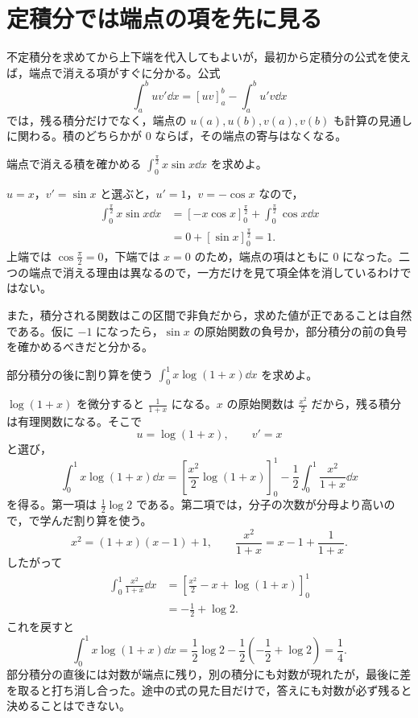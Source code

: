 \section{定積分では端点の項を先に見る}\label{節:定積分の部分積分}

不定積分を求めてから上下端を代入してもよいが，最初から定積分の公式を使えば，端点で消える項がすぐに分かる。公式
\[
 \int_a^b uv'\dd x=[uv]_a^b-\int_a^b u'v\dd x
\]
では，残る積分だけでなく，端点の $u(a),u(b),v(a),v(b)$ も計算の見通しに関わる。積のどちらかが $0$ ならば，その端点の寄与はなくなる。

\begin{example}{端点で消える積を確かめる}
$\int_0^{\frac\pi2}x\sin x\dd x$ を求めよ。
\end{example}

$u=x$，$v'=\sin x$ と選ぶと，$u'=1$，$v=-\cos x$ なので，
\[
\begin{aligned}
 \int_0^{\frac\pi2}x\sin x\dd x
 &=[-x\cos x]_0^{\frac\pi2}
   +\int_0^{\frac\pi2}\cos x\dd x\\
 &=0+[\sin x]_0^{\frac\pi2}=1.
\end{aligned}
\]
上端では $\cos\frac\pi2=0$，下端では $x=0$ のため，端点の項はともに $0$ になった。二つの端点で消える理由は異なるので，一方だけを見て項全体を消しているわけではない。

また，積分される関数はこの区間で非負だから，求めた値が正であることは自然である。仮に $-1$ になったら，$\sin x$ の原始関数の負号か，部分積分の前の負号を確かめるべきだと分かる。

\begin{example}{部分積分の後に割り算を使う}
$\int_0^1x\log(1+x)\dd x$ を求めよ。
\end{example}

$\log(1+x)$ を微分すると $\frac1{1+x}$ になる。$x$ の原始関数は $\frac{x^2}{2}$ だから，残る積分は有理関数になる。そこで
\[
 u=\log(1+x),\qquad v'=x
\]
と選び，
\[
 \int_0^1x\log(1+x)\dd x
 =\left[\frac{x^2}{2}\log(1+x)\right]_0^1
  -\frac12\int_0^1\frac{x^2}{1+x}\dd x
\]
を得る。第一項は $\frac12\log2$ である。第二項では，分子の次数が分母より高いので，で学んだ割り算を使う。
\[
 x^2=(1+x)(x-1)+1,
 \qquad
 \frac{x^2}{1+x}=x-1+\frac1{1+x}.
\]
したがって
\[
\begin{aligned}
 \int_0^1\frac{x^2}{1+x}\dd x
 &=\left[\frac{x^2}{2}-x+\log(1+x)\right]_0^1\\
 &=-\frac12+\log2.
\end{aligned}
\]
これを戻すと
\[
 \int_0^1x\log(1+x)\dd x
 =\frac12\log2-\frac12\left(-\frac12+\log2\right)
 =\frac14.
\]
部分積分の直後には対数が端点に残り，別の積分にも対数が現れたが，最後に差を取ると打ち消し合った。途中の式の見た目だけで，答えにも対数が必ず残ると決めることはできない。

